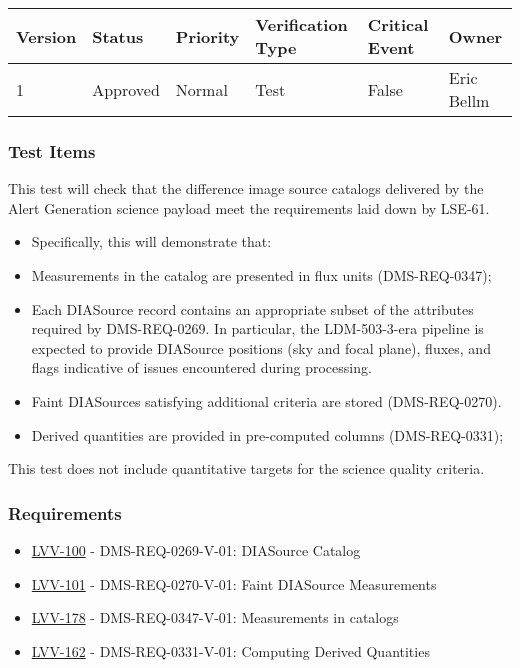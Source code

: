\begin{longtable}[]{@{}llllll@{}}
\toprule
Version & Status & Priority & Verification Type & Critical Event &
Owner\tabularnewline
\midrule
\endhead
1 & Approved & Normal & Test & False & Eric Bellm\tabularnewline
\bottomrule
\end{longtable}

\subsubsection{Test Items}\label{test-items-4}

This test will check that the difference image source catalogs delivered
by the Alert Generation science payload meet the requirements laid down
by LSE-61.

\begin{itemize}
\tightlist
\item
  Specifically, this will demonstrate that:
\item
  Measurements in the catalog are presented in flux units
  (DMS-REQ-0347);
\item
  Each DIASource record contains an appropriate subset of the attributes
  required by DMS-REQ-0269. In particular, the LDM-503-3-era pipeline is
  expected to provide DIASource positions (sky and focal plane), fluxes,
  and flags indicative of issues encountered during processing.
\item
  Faint DIASources satisfying additional criteria are stored
  (DMS-REQ-0270).
\item
  Derived quantities are provided in pre-computed columns
  (DMS-REQ-0331);
\end{itemize}

This test does not include quantitative targets for the science quality
criteria.\\[2\baselineskip]

\subsubsection{Requirements}\label{requirements-4}

\begin{itemize}
\tightlist
\item
  \href{https://jira.lsstcorp.org/browse/LVV-100}{LVV-100} -
  DMS-REQ-0269-V-01: DIASource Catalog
\item
  \href{https://jira.lsstcorp.org/browse/LVV-101}{LVV-101} -
  DMS-REQ-0270-V-01: Faint DIASource Measurements
\item
  \href{https://jira.lsstcorp.org/browse/LVV-178}{LVV-178} -
  DMS-REQ-0347-V-01: Measurements in catalogs
\item
  \href{https://jira.lsstcorp.org/browse/LVV-162}{LVV-162} -
  DMS-REQ-0331-V-01: Computing Derived Quantities
\end{itemize}

